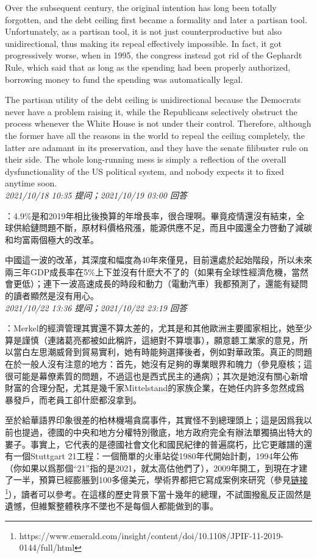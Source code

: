 \documentclass[twocolumn]{ctexart}
\begin{document}
Over the subsequent century, the original intention has long been totally forgotten, and the debt ceiling first became a formality and later a partisan tool. Unfortunately, as a partisan tool, it is not just counterproductive but also unidirectional, thus making its repeal effectively impossible. In fact, it got progressively worse, when in 1995, the congress instead got rid of the Gephardt Rule, which said that as long as the spending had been properly authorized, borrowing money to fund the spending was automatically legal.

The partisan utility of the debt ceiling is unidirectional because the Democrats never have a problem raising it, while the Republicans selectively obstruct the process whenever the White House is not under their control. Therefore, although the former have all the reasons in the world to repeal the ceiling completely, the latter are adamant in its preservation, and they have the senate filibuster rule on their side. The whole long-running mess is simply a reflection of the overall dysfunctionality of the US political system, and nobody expects it to fixed anytime soon.
\\

\textit{\hfill\noindent\small 2021/10/18 10:35 提问；2021/10/19 03:00 回答}

：4.9\%是和2019年相比後換算的年增長率，很合理啊。畢竟疫情還沒有結束，全球供給鏈問題不斷，原材料價格飛漲，能源供應不足，而且中國還全力啓動了減碳和均富兩個極大的改革。

中國這一波的改革，其深度和幅度為40年來僅見，目前還處於起始階段，所以未來兩三年GDP成長率在5\%上下並沒有什麽大不了的（如果有全球性經濟危機，當然會更低）；連下一波高速成長的時段和動力（電動汽車）我都預測了，還能有疑問的讀者顯然是沒有用心。
\\

\textit{\hfill\noindent\small 2021/10/22 13:36 提问；2021/10/22 23:19 回答}

：Merkel的經濟管理其實還不算太差的，尤其是和其他歐洲主要國家相比，她至少算是謹慎（連諸葛亮都被如此稱許，這絕對不算壞事），願意聼工業家的意見，所以當白左思潮威脅到貿易實利，她有時能夠選擇後者，例如對華政策。真正的問題在於一般人沒有注意的地方：首先，她沒有足夠的專業眼界和魄力（參見廢核；這很可能是幕僚素質的問題，不過這也是西式民主的通病）；其次是她沒有關心新增財富的合理分配，尤其是幾千家Mittelstand的家族企業，在她任内許多忽然成爲暴發戶，而老員工卻什麽都沒拿到。

至於給華語界印象很差的柏林機場貪腐事件，其實怪不到總理頭上；這是因爲我以前也提過，德國的中央和地方分權特別徹底，地方政府完全有辦法單獨搞出特大的婁子。事實上，它代表的是德國社會文化和國民紀律的普遍腐朽，比它更離譜的還有一個Stuttgart 21工程：一個簡單的火車站從1980年代開始計劃，1994年公佈（你如果以爲那個“21”指的是2021，就太高估他們了），2009年開工，到現在才建了一半，預算已經膨脹到100多億美元，學術界都把它寫成案例來研究（參見\href{https://www.emerald.com/insight/content/doi/10.1108/JPIF-11-2019-0144/full/html}{链接\footnote{\url{https://www.emerald.com/insight/content/doi/10.1108/JPIF-11-2019-0144/full/html}}}），讀者可以參考。在這樣的歷史背景下當十幾年的總理，不試圖撥亂反正固然是遺憾，但維繫整體秩序不墜也不是每個人都能做到的事。
\end{document}
